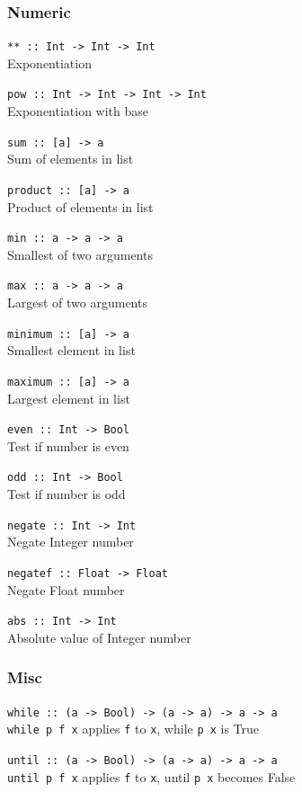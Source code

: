 \subsubsection{Numeric}

\texttt{{**} :: Int -> Int -> Int}\ \\
Exponentiation

\texttt{pow :: Int -> Int -> Int -> Int}\ \\
Exponentiation with base

\texttt{sum :: [a] -> a}\ \\
Sum of elements in list

\texttt{product :: [a] -> a}\ \\
Product of elements in list

\texttt{min :: a -> a -> a}\ \\
Smallest of two arguments

\texttt{max :: a -> a -> a}\ \\
Largest of two arguments

\texttt{minimum :: [a] -> a}\ \\
Smallest element in list

\texttt{maximum :: [a] -> a}\ \\
Largest element in list

\texttt{even :: Int -> Bool}\ \\
Test if number is even

\texttt{odd :: Int -> Bool}\ \\
Test if number is odd

\texttt{negate :: Int -> Int}\ \\
Negate Integer number

\texttt{negatef :: Float -> Float}\ \\
Negate Float number

\texttt{abs :: Int -> Int}\ \\
Absolute value of Integer number

\subsubsection{Misc}

\texttt{while :: (a -> Bool) -> (a -> a) -> a -> a}\ \\
\texttt{while p f x} applies \texttt{f} to \texttt{x}, while \texttt{p x} is True

\texttt{until :: (a -> Bool) -> (a -> a) -> a -> a}\ \\
\texttt{until p f x} applies \texttt{f} to \texttt{x}, until \texttt{p x} becomes False
